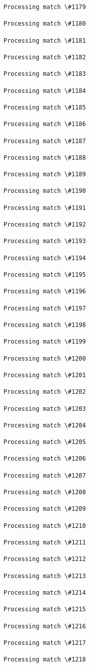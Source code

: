 \documentclass[11pt]{article}
\begin{document}
\begin{Verbatim}[commandchars=\\\{\}]
Processing match \#1179

Processing match \#1180

Processing match \#1181

Processing match \#1182

Processing match \#1183

Processing match \#1184

Processing match \#1185

Processing match \#1186

Processing match \#1187

Processing match \#1188

Processing match \#1189

Processing match \#1190

Processing match \#1191

Processing match \#1192

Processing match \#1193

Processing match \#1194

Processing match \#1195

Processing match \#1196

Processing match \#1197

Processing match \#1198

Processing match \#1199

Processing match \#1200

Processing match \#1201

Processing match \#1202

Processing match \#1203

Processing match \#1204

Processing match \#1205

Processing match \#1206

Processing match \#1207

Processing match \#1208

Processing match \#1209

Processing match \#1210

Processing match \#1211

Processing match \#1212

Processing match \#1213

Processing match \#1214

Processing match \#1215

Processing match \#1216

Processing match \#1217

Processing match \#1218


\end{Verbatim}
\end{document}
